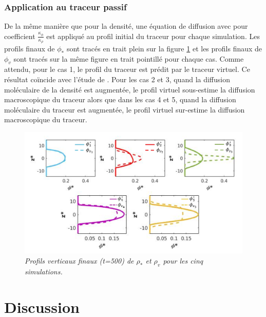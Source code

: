 \documentclass[a4paper,12pt]{article}
\begin{document}
    \subsubsection{Application au traceur passif}
    
    De la même manière que pour la densité, une équation de diffusion avec pour coefficient $\frac{\kappa_{\phi}}{\kappa_{\rho}}$ est appliqué au profil initial du traceur pour chaque simulation. Les profils finaux de $\phi_*$ sont tracés en trait plein sur la figure \ref{profils_Krho} et les profils finaux de $\phi_v$ sont tracés sur la même figure en trait pointillé pour chaque cas. Comme attendu, pour le cas 1, le profil du traceur est prédit par le traceur virtuel. Ce résultat coïncide avec l'étude de \cite{penney_diapycnal_2020}. Pour les cas 2 et 3, quand la diffusion moléculaire de la densité est augmentée, le profil virtuel sous-estime la diffusion macroscopique du traceur alors que dans les cas 4 et 5, quand la diffusion moléculaire du traceur est augmentée, le profil virtuel sur-estime la diffusion macroscopique du traceur. 
    
    \begin{figure}[!h]
        \centering
        \includegraphics[width=1\linewidth]{figures/profils_Krho.png}
        \caption{\textit{Profils verticaux finaux (t=500) de $\rho_*$ et $\rho_v$ pour les cinq simulations.}}
        \label{profils_Krho}
    \end{figure}


\section{Discussion}
    
\end{document}
